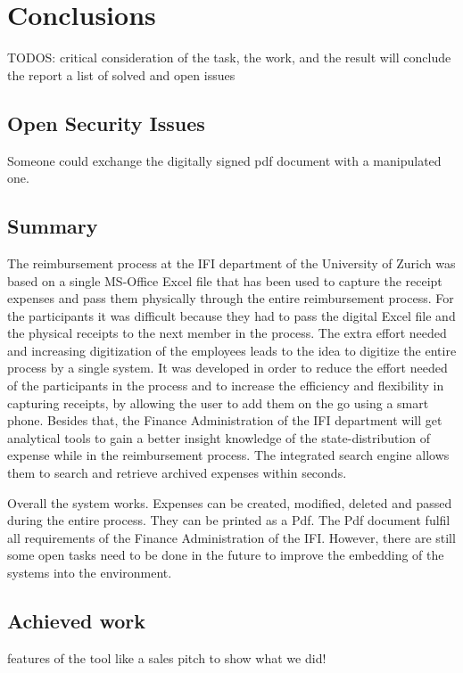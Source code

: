\chapter{Conclusions}

TODOS:
 critical  consideration of the task, the work, and the result will conclude the report
 a list of solved and open issues
 
 
 \section{Open Security Issues}
 Someone could exchange the digitally signed pdf document with a manipulated one.
 
 
\section{Summary}

The reimbursement process at the IFI department of the University of Zurich was based on a single MS-Office Excel file that has been used to capture the receipt expenses and pass them physically through the entire reimbursement process. For the participants it was difficult because they had to pass the digital Excel file and the physical receipts to the next member in the process. The extra effort needed and increasing digitization of the employees leads to the idea to digitize the entire process by a single system.\newline
It was developed in order to reduce the effort needed of the participants in the process and to increase the efficiency and flexibility in capturing receipts, by allowing the user to add them on the go using a smart phone. Besides that, the Finance Administration of the IFI department will get analytical tools to gain a better insight knowledge of the state-distribution of expense while in the reimbursement process. The integrated search engine allows them to search and retrieve archived expenses within seconds. \par
Overall the system works. Expenses can be created, modified, deleted and passed during the entire process. They can be printed as a Pdf. The Pdf document fulfil all requirements of the Finance Administration of the IFI. However, there are still some open tasks need to be done in the future to improve the embedding of the systems into the environment.

\section{Achieved work}
	features of the tool like a sales pitch to show what we did!

